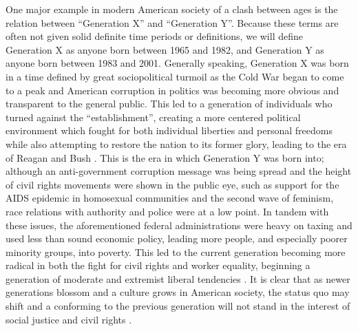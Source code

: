 \documentclass[12pt,letterpaper]{report}
\begin{document}
  \par One major example in modern American society of a clash between ages is the relation between ``Generation X'' and ``Generation Y''. Because these terms are often not given solid definite time periods or definitions, we will define Generation X as anyone born between 1965 and 1982, and Generation Y as anyone born between 1983 and 2001. Generally speaking, Generation X was born in a time defined by great sociopolitical turmoil as the Cold War began to come to a peak and American corruption in politics was becoming more obvious and transparent to the general public. This led to a generation of individuals who turned against the ``establishment'', creating a more centered political environment which fought for both individual liberties and personal freedoms while also attempting to restore the nation to its former glory, leading to the era of Reagan and Bush \citep{Forbes2016}. This is the era in which Generation Y was born into; although an anti-government corruption message was being spread and the height of civil rights movements were shown in the public eye, such as support for the AIDS epidemic in homosexual communities and the second wave of feminism, race relations with authority and police were at a low point. In tandem with these issues, the aforementioned federal administrations were heavy on taxing and used less than sound economic policy, leading more people, and especially poorer minority groups, into poverty. This led to the current generation becoming more radical in both the fight for civil rights and worker equality, beginning a generation of moderate and extremist liberal tendencies \citep{BBC2017}. It is clear that as newer generations blossom and a culture grows in American society, the status quo may shift and a conforming to the previous generation will not stand in the interest of social justice and civil rights \citep{PEW2020}.
\end{document}
